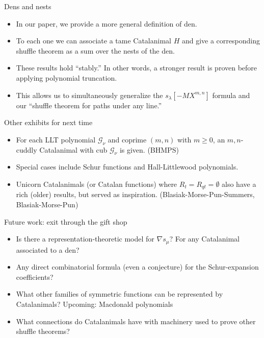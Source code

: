 \documentclass{beamer}
\newcommand{\Gcal}{\mathcal{G}}
\newcounter{c}
\begin{document}
\begin{frame}{Dens and nests}
  \begin{itemize}
  \item In our paper, we provide a more general definition of den.\pause
  \item To each one we can
    associate a tame Catalanimal \(H\) and give a corresponding
    shuffle theorem as a sum over the nests of the den.\pause
  \item These results hold ``stably.'' In other words, a stronger result is
    proven before applying polynomial truncation.\pause
  \item This allows us to simultaneously generalize the
    \(s_\lambda[-MX^{m,n}]\) formula and our ``shuffle theorem for
    paths under any line.''
  \end{itemize}
\end{frame}
\begin{frame}{Other exhibits for next time}
  \begin{itemize}
  \item For each LLT polynomial \(\Gcal_\nu\) and coprime \((m,n)\) with \(m \geq 0\), an
    \(m,n\)-cuddly Catalanimal with cub \(\Gcal_\nu\) is given. (BHMPS)\pause
  \item Special cases include Schur functions and Hall-Littlewood
    polynomials.\pause
  \item Unicorn Catalanimals (or Catalan functions) where
    \(R_t = R_{qt} = \emptyset\) also have a rich
    (older) results, but served as inspiration. (Blasiak-Morse-Pun-Summers, Blasiak-Morse-Pun)
  \end{itemize}
\end{frame}
\begin{frame}{Future work: exit through the gift shop}
  \begin{itemize}
  \item Is there a representation-theoretic model for \(\nabla
    s_\mu\)? For any Catalanimal associated to a den?\pause
  \item Any direct combinatorial formula (even a conjecture) for the Schur-expansion coefficients?\pause
  \item What other families of symmetric functions can be represented
    by Catalanimals? Upcoming: Macdonald polynomials\pause
  \item What connections do Catalanimals have with machinery used to
    prove other shuffle theorems?
  \end{itemize}
\end{frame}
\end{document}
